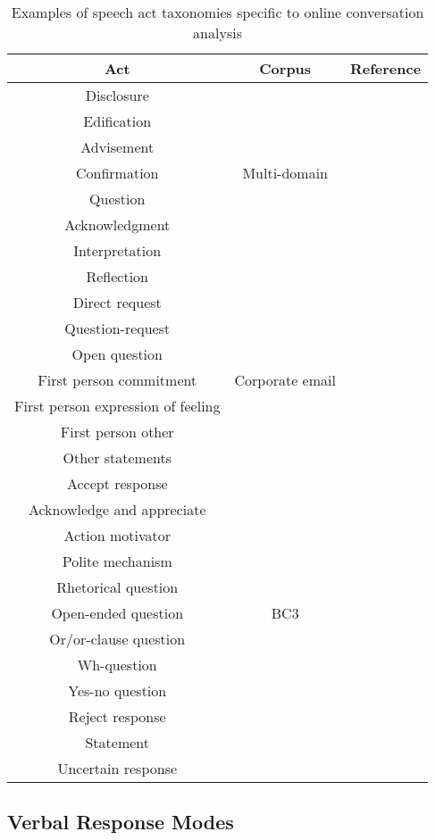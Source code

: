 \documentclass[11pt]{article}
\begin{document}
\begin{table}
	\begin{tabularx}{\textwidth}{c c c}
		\toprule
		Act & Corpus & Reference \\
		\midrule
		Disclosure &  & \\
		Edification &  & \\
		Advisement &  & \\
		Confirmation & Multi-domain & \cite{Lampert_classifyingspeech} \\
		Question &  & \\
		Acknowledgment &  & \\
		Interpretation &  & \\
		Reflection &  & \\
		\midrule
		Direct request &  & \\
		Question-request &  & \\
		Open question &  & \\
		First person commitment & Corporate email & \cite{de2013classification} \\
		First person expression of feeling &  & \\
		First person other &  & \\
		Other statements &  & \\
		\midrule
		Accept response &  & \\
		Acknowledge and appreciate &  & \\
		Action motivator &  & \\
		Polite mechanism &  & \\
		Rhetorical question &  & \\
		Open-ended question & BC3 & \cite{JanAAAI08} \\
		Or/or-clause question &  & \\
		Wh-question &  & \\
		Yes-no question &  & \\
		Reject response &  & \\
		Statement &  & \\
		Uncertain response &  & \\
		\bottomrule
	\end{tabularx}
	\caption{Examples of speech act taxonomies specific to online conversation analysis}
	\label{fig:emailTaxonomies}
\end{table}

\subsection{Verbal Response Modes}
\end{document}
